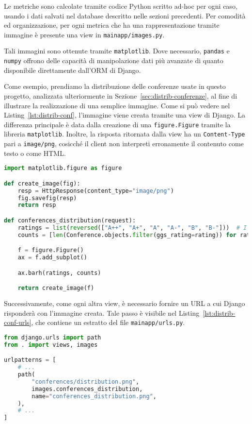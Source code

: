 Le metriche sono calcolate tramite codice Python scritto ad-hoc per ogni
caso, usando i dati salvati nel database descritto nelle sezioni precedenti.
Per comodità ed organizzazione, per ogni metrica che ha una rappresentazione
tramite immagine è presente una view in \texttt{mainapp/images.py}.

Tali immagini sono ottenute tramite \texttt{matplotlib}. Dove necessario,
\texttt{pandas} e \texttt{numpy} offrono delle capacità di manipolazione dati
più avanzate di quanto disponibile direttamente dall'ORM di Django.

Come esempio, prendiamo la distribuzione delle conferenze usate in questo
progetto, analizzata ulteriormente in Sezione~\ref{sec:distrib-conferenze},
al fine di illustrare la realizzazione di una semplice immagine.
Come si può vedere nel Listing~\ref{lst:distrib-conf}, l'immagine viene creata
tramite una view di Django. La differenza principale è data dalla creazione
di una \texttt{figure.Figure} tramite la libreria \texttt{matplotlib}.
Inoltre, la risposta ritornata dalla view ha un \texttt{Content-Type} pari a
\texttt{image/png}, cosicché il client non interpreti erronamente il contenuto
come testo o come HTML.

\begin{lstlisting}[language=Python, caption=Distribuzione delle conferenze, label=lst:distrib-conf]
import matplotlib.figure as figure

def create_image(fig):
    resp = HttpResponse(content_type="image/png")
    fig.savefig(resp)
    return resp

def conferences_distribution(request):
    ratings = list(reversed(["A++", "A+", "A", "A-", "B", "B-"]))  # I want A++ on top
    counts = [len(Conference.objects.filter(ggs_rating=rating)) for rating in ratings]

    f = figure.Figure()
    ax = f.add_subplot()

    ax.barh(ratings, counts)

    return create_image(f)
\end{lstlisting}

Successivamente, come ogni altra view, è necessario fornire un URL a cui
Django risponderà con l'immagine creata. Tale passo è visibile nel
Listing~\ref{lst:distrib-conf-urls}, che contiene un estratto del file
\texttt{mainapp/urls.py}.

\begin{lstlisting}[language=Python, caption=Estratto di \texttt{mainapp/urls.py}, label=lst:distrib-conf-urls]
from django.urls import path
from . import views, images

urlpatterns = [
    # ...
    path(
        "conferences/distribution.png",
        images.conferences_distribution,
        name="conferences_distribution.png",
    ),
    # ...
]
\end{lstlisting}
